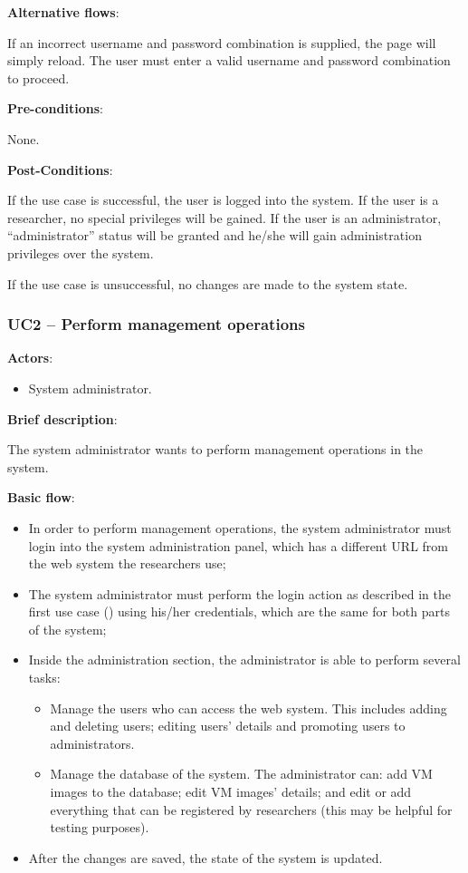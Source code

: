 \textbf{Alternative flows}:

If an incorrect username and password combination is supplied, the page will simply reload. The user must enter a valid username and password combination to proceed.

\textbf{Pre-conditions}:

None.

\textbf{Post-Conditions}:

If the use case is successful, the user is logged into the system. If the user is a researcher, no special privileges will be gained. If the user is an administrator, ``administrator'' status will be granted and he/she will gain administration privileges over the system.

If the use case is unsuccessful, no changes are made to the system state.

\subsubsection{UC2 -- Perform management operations}\label{uc2}

\textbf{Actors}:

\begin{itemize}
\item System administrator.
\end{itemize}

\textbf{Brief description}:

The system administrator wants to perform management operations in the system.

\textbf{Basic flow}:

\begin{itemize}
\item In order to perform management operations, the system administrator must login into the system administration panel, which has a different URL from the web system the researchers use;
\item The system administrator must perform the login action as described in the first use case () using his/her credentials, which are the same for both parts of the system;
\item Inside the administration section, the administrator is able to perform several tasks:
\begin{itemize}
\item Manage the users who can access the web system. This includes adding and deleting users; editing users' details and promoting users to administrators.
\item Manage the database of the system. The administrator can: add VM images to the database; edit VM images' details; and edit or add everything that can be registered by researchers (this may be helpful for testing purposes).
\end{itemize}
\item After the changes are saved, the state of the system is updated.
\end{itemize}

